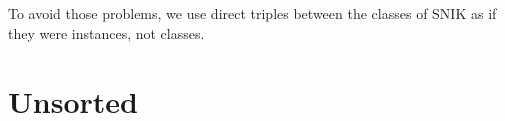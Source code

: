 \documentclass[sw]{iosart2x}
\begin{document}
To avoid those problems, we use direct triples between the classes of SNIK as if they were instances, not classes.

\paragraph{}


\section{Unsorted}
\end{document}
